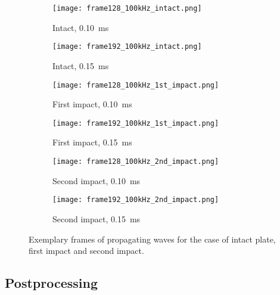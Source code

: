 \documentclass[times,final]{elsarticle}
\begin{document}
\begin{figure} [h!]
	\centering
		\begin{subfigure}[b]{0.49\textwidth}
		\texttt{[image: frame128\_100kHz\_intact.png]}
		\caption{Intact, \SI{0.10}{\milli\second}}
		\label{fig:frame128_intact}
	\end{subfigure}
	\begin{subfigure}[b]{0.49\textwidth}
		\texttt{[image: frame192\_100kHz\_intact.png]}
		\caption{Intact, \SI{0.15}{\milli\second}}
		\label{fig:frame192_intact}
	\end{subfigure}
	\begin{subfigure}[b]{0.49\textwidth}
		\texttt{[image: frame128\_100kHz\_1st\_impact.png]}
		\caption{First impact, \SI{0.10}{\milli\second}}
		\label{fig:frame128_1st_impact}
	\end{subfigure}
	\begin{subfigure}[b]{0.49\textwidth}
		\texttt{[image: frame192\_100kHz\_1st\_impact.png]}
		\caption{First impact, \SI{0.15}{\milli\second}}
		\label{fig:frame192_1st_impact}
	\end{subfigure}
	\begin{subfigure}[b]{0.49\textwidth}
		\texttt{[image: frame128\_100kHz\_2nd\_impact.png]}
		\caption{Second impact, \SI{0.10}{\milli\second}}
		\label{fig:frame128_2nd_impact}
	\end{subfigure}
	\begin{subfigure}[b]{0.49\textwidth}
		\texttt{[image: frame192\_100kHz\_2nd\_impact.png]}
		\caption{Second impact, \SI{0.15}{\milli\second}}
		\label{fig:frame192_2nd_impact}
	\end{subfigure}
	\caption{Exemplary frames of propagating waves for the case of intact plate, first impact and second impact.}
	\label{fig:frames}
\end{figure}

\subsection{Postprocessing}
\end{document}
